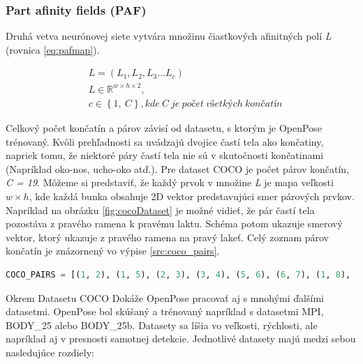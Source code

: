 \documentclass[slovak,master,dept460,male,cpp,cpdeclaration]{diploma}
\begin{document}
\subsubsection{Part afinity fields (PAF)}
Druhá vetva neurónovej siete vytvára množinu čiastkových afinitných polí \textit{L} (rovnica \ref{eq:pafmap}).

\begin{eqnarray}
& L = (L_{1}, L_{2}, L_{3} ... L_{c}) \label{eq:pafmap}\\
& L\in\mathbb{R}^{w \times  h \times 2},\nonumber\\
& c\in \left \{1,\: C  \right \}, kde\: C\: je\: počet\: všetkých\: končatín\nonumber
\end{eqnarray}

Celkový počet končatín a párov závisí od datasetu, s ktorým je OpenPose trénovaný. Kvôli prehľadnosti sa uvádzajú dvojice častí tela ako končatiny, napriek tomu, že niektoré páry častí tela nie sú v skutočnosti končatinami (Napríklad oko-nos, ucho-oko atď.). Pre dataset COCO je počet párov končatín, \textit{C = 19}. Môžeme si predstaviť, že každý prvok v množine \textit{L} je mapa veľkosti \textit{$w\times h$}, kde každá bunka obsahuje 2D vektor predstavujúci smer párových prvkov. Napríklad na obrázku \ref{fig:cocoDataset} je možné vidieť, že pár častí tela pozostáva z pravého ramena k pravému laktu. Schéma potom ukazuje smerový vektor, ktorý ukazuje z pravého ramena na pravý lakeť. Celý zoznam párov končatín je znázornený vo výpise \ref{src:coco_pairs}.\bigskip

\begin{lstlisting}[language=Python,label=src:coco_pairs,caption={Množina párov končatín v datasete COCO}]
COCO_PAIRS = [(1, 2), (1, 5), (2, 3), (3, 4), (5, 6), (6, 7), (1, 8), (8, 9), (9, 10), (1, 11), (11, 12), (12, 13), (1, 0), (0, 14), (14, 16), (0, 15), (15, 17), (2, 16), (5, 17)]
\end{lstlisting}

\bigskip
Okrem Datasetu COCO Dokáže OpenPose pracovať aj s mnohými ďalšími datasetmi. OpenPose bol skúšaný a trénovaný napríklad s datasetmi MPI\cite{andriluka14cvpr}, BODY\_25 alebo BODY\_25b. Datasety sa líšia vo veľkosti, rýchlosti, ale napríklad  aj v presnosti samotnej detekcie. Jednotlivé datasety majú medzi sebou nasledujúce rozdiely:
\end{document}
